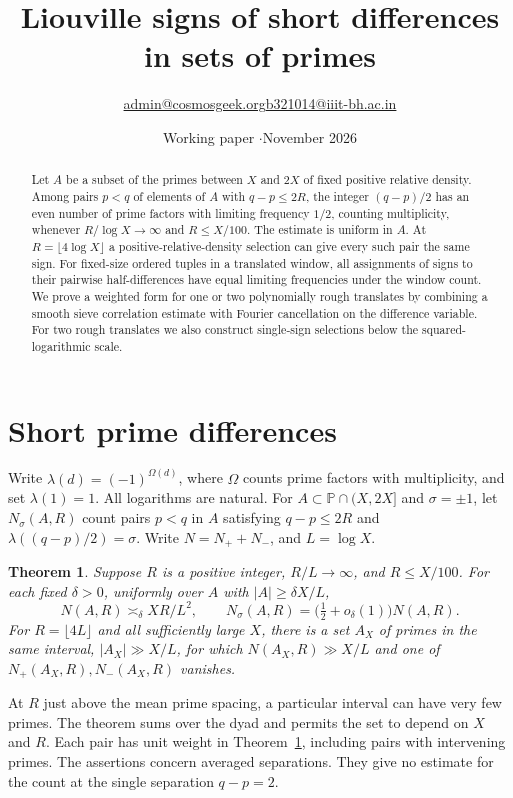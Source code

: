 \documentclass[11pt]{article}
\title{\vspace{-1.1em}\bfseries Liouville signs of short differences\\in sets of primes}
\author{\small \href{mailto:admin@cosmosgeek.org}{admin@cosmosgeek.org}\qquad \href{mailto:b321014@iiit-bh.ac.in}{b321014@iiit-bh.ac.in}}
\date{\small Working paper \enspace$\cdot$\enspace November 2026}
\newtheorem{theorem}{Theorem}[section]
\newcommand{\PP}{\mathbb P}
\begin{document}
\maketitle
\begin{abstract}
Let \(A\) be a subset of the primes between \(X\) and \(2X\) of fixed positive relative density.
Among pairs \(p<q\) of elements of \(A\) with \(q-p\le 2R\), the integer
\((q-p)/2\) has an even number of prime factors with limiting frequency \(1/2\),
counting multiplicity, whenever \(R/\log X\to\infty\) and \(R\le X/100\).
The estimate is uniform in \(A\). At \(R=\lfloor4\log X\rfloor\) a positive-relative-density
selection can give every such pair the same sign. For fixed-size ordered tuples
in a translated window, all assignments of signs to their pairwise half-differences
have equal limiting frequencies under the window count. We prove a weighted
form for one or two polynomially rough translates by combining a smooth sieve
correlation estimate with Fourier cancellation on the difference variable.
For two rough translates we also construct single-sign selections below the squared-logarithmic scale.
\end{abstract}

\section{Short prime differences}
Write \(\lambda(d)=(-1)^{\Omega(d)}\), where \(\Omega\) counts prime factors
with multiplicity, and set \(\lambda(1)=1\). All logarithms are natural.
For \(A\subset\PP\cap(X,2X]\) and \(\sigma=\pm1\), let \(N_\sigma(A,R)\)
count pairs \(p<q\) in \(A\) satisfying \(q-p\le2R\) and
\(\lambda((q-p)/2)=\sigma\). Write \(N=N_++N_-\), and \(L=\log X\).

\begin{theorem}\label{th:prime}
Suppose \(R\) is a positive integer, \(R/L\to\infty\), and \(R\le X/100\).
For each fixed \(\delta>0\), uniformly over \(A\) with \(|A|\ge\delta X/L\),
\[
    N(A,R)\asymp_\delta XR/L^2,\qquad
    N_\sigma(A,R)=\bigl(\tfrac12+o_\delta(1)\bigr)N(A,R).
\]
For \(R=\lfloor4L\rfloor\) and all sufficiently large \(X\), there is a set
\(A_X\) of primes in the same interval, \(|A_X|\gg X/L\), for which
\(N(A_X,R)\gg X/L\) and one of \(N_+(A_X,R),N_-(A_X,R)\) vanishes.
\end{theorem}

At \(R\) just above the mean prime spacing, a particular interval can have very
few primes. The theorem sums over the dyad and permits the set to depend on
\(X\) and \(R\). Each pair has unit weight in Theorem~\ref{th:prime}, including
pairs with intervening primes. The assertions concern averaged separations.
They give no estimate for the count at the single separation \(q-p=2\).
\end{document}
